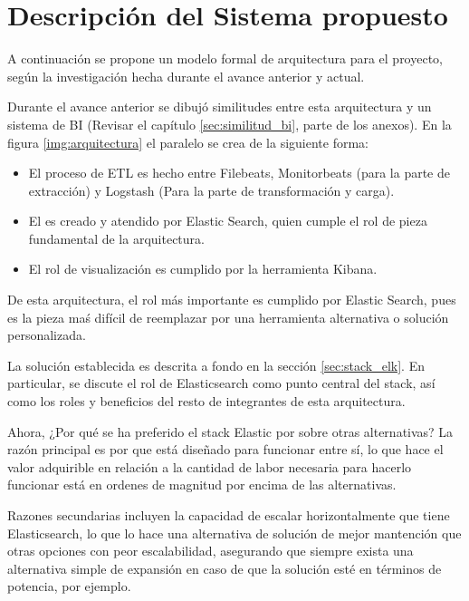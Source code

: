 \section{Descripción del Sistema propuesto}
\label{section:descripcion}

A continuación se propone un modelo formal de arquitectura para el proyecto, según la investigación hecha durante el avance anterior y actual.


Durante el avance anterior se dibujó similitudes entre esta arquitectura y un sistema de BI (Revisar el capítulo \ref{sec:similitud_bi}, parte de los anexos). En la figura \ref{img:arquitectura} el paralelo se crea de la siguiente forma:

\begin{itemize}
  \item El proceso de ETL es hecho entre Filebeats, Monitorbeats (para la parte de extracción) y Logstash (Para la parte de transformación y carga).
  \item El  es creado y atendido por Elastic Search, quien cumple el rol de pieza fundamental de la arquitectura.
  \item El rol de visualización es cumplido por la herramienta Kibana.
\end{itemize}

De esta arquitectura, el rol más importante es cumplido por Elastic Search, pues es la pieza maś difícil de reemplazar por una herramienta alternativa o solución personalizada. 

La solución establecida es descrita a fondo en la sección \ref{sec:stack_elk}. En particular, se discute el rol de Elasticsearch como punto central del stack, así como los roles y beneficios del resto de integrantes de esta arquitectura.

Ahora, ¿Por qué se ha preferido el stack Elastic por sobre otras alternativas? La razón principal es por que está diseñado para funcionar entre sí, lo que hace el valor adquirible en relación a la cantidad de labor necesaria para hacerlo funcionar está en ordenes de magnitud por encima de las alternativas.

Razones secundarias incluyen la capacidad de escalar horizontalmente que tiene Elasticsearch, lo que lo hace una alternativa de solución de mejor mantención que otras opciones con peor escalabilidad, asegurando que siempre exista una alternativa simple de expansión en caso de que la solución esté  en términos de potencia, por ejemplo.

